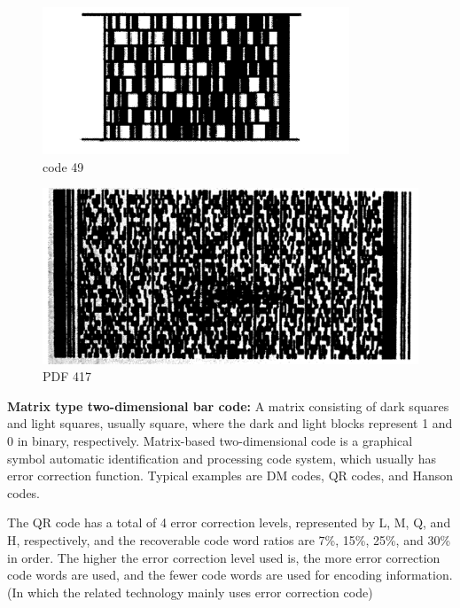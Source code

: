 \documentclass[journal]{IEEEtran}
\begin{document}
\begin{figure}[htbp]
\centerline{\includegraphics[scale=1]{code49.png}}
\caption{code 49}
\label{fig}
\end{figure}


\begin{figure}[htbp]
\centerline{\includegraphics[scale=0.5]{PDF417.png}}
\caption{PDF 417}
\label{fig}
\end{figure}

\textbf{Matrix type two-dimensional bar code:}
A matrix consisting of dark squares and light squares, usually square, where the dark and light blocks represent 1 and 0 in binary, respectively. Matrix-based two-dimensional code is a graphical symbol automatic identification and processing code system, which usually has error correction function. Typical examples are DM codes, QR codes, and Hanson codes.

The QR code has a total of 4 error correction levels, represented by L, M, Q, and H, respectively, and the recoverable code word ratios are 7\%, 15\%, 25\%, and 30\% in order. The higher the error correction level used is, the more error correction code words are used, and the fewer code words are used for encoding information. (In which the related technology mainly uses error correction code)
\end{document}
